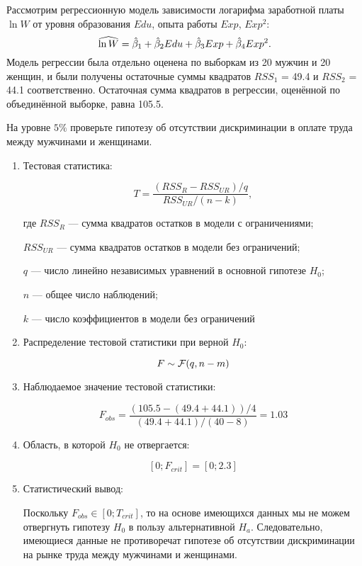 \begin{problem}  %
Рассмотрим регрессионную модель зависимости логарифма заработной платы $\ln W$ 
от уровня образования $Edu$, опыта работы $Exp$, $Exp^2$:
\[
\widehat{\ln W}=\hat{\beta}_1+\hat{\beta}_2Edu+\hat{\beta}_3Exp+\hat{\beta}_4Exp^2.
\]
Модель регрессии была отдельно оценена по выборкам из 20 мужчин и 20 женщин, 
и были получены остаточные суммы квадратов $RSS_1$ = 49.4 и $RSS_2$ = 44.1 соответственно. 
Остаточная сумма квадратов в регрессии, оценённой по объединённой выборке, равна 105.5. 

На уровне $5\%$ проверьте гипотезу об отсутствии дискриминации в оплате труда между мужчинами и женщинами.


\begin{sol}
  \begin{enumerate}
    \item Тестовая статистика:
    
    \[
    T = \frac{(RSS_R-RSS_{UR})/q}{RSS_{UR}/(n-k)},
    \]
    
    где $RSS_R$ — сумма квадратов остатков в модели с ограничениями;
    
    $RSS_{UR}$ — сумма квадратов остатков в модели без ограничений;
    
    $q$ — число линейно независимых уравнений в основной гипотезе $H_0$;
    
    $n$ — общее число наблюдений;
    
    $k$ — число коэффициентов в модели без ограничений
    
    \item Распределение тестовой статистики при верной $H_0$:
    
    \[ F \sim \mathcal{F}(q, n-m) \]
    
    \item Наблюдаемое значение тестовой статистики:
    
    \[ F_{obs} = \frac{(105.5-(49.4+44.1))/4}{(49.4+44.1)/(40-8)}=1.03 \]
    
    \item Область, в которой $H_0$ не отвергается:
    
    \[ [0;F_{crit}]=[0;2.3] \]
    
    \item Статистический вывод:
    
    Поскольку $F_{obs} \in [0;T_{crit}]$, то на основе имеющихся данных мы не можем отвергнуть гипотезу $H_0$ в пользу альтернативной $H_a$. 
    Следовательно, имеющиеся данные не противоречат гипотезе об отсутствии дискриминации на рынке труда между мужчинами и женщинами.
    
    \end{enumerate}
    

\end{sol}
\end{problem}



